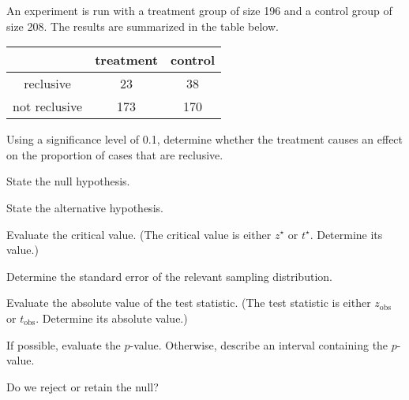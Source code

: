 
\begin{question}
An experiment is run with a treatment group of size 196 and a control
group of size 208. The results are summarized in the table below.

\begin{longtable}[]{@{}ccc@{}}
\toprule
& treatment & control\tabularnewline
\midrule
\endhead
reclusive & 23 & 38\tabularnewline
not reclusive & 173 & 170\tabularnewline
\bottomrule
\end{longtable}

Using a significance level of 0.1, determine whether the treatment
causes an effect on the proportion of cases that are reclusive.
\begin{answerlist}
  \item State the null hypothesis.
  \item State the alternative hypothesis.
  \item Evaluate the critical value. (The critical value is either \(z^\star\)
or \(t^\star\). Determine its value.)
  \item Determine the standard error of the relevant sampling distribution.
  \item Evaluate the absolute value of the test statistic. (The test statistic
is either \(z_\text{obs}\) or \(t_\text{obs}\). Determine its absolute
value.)
  \item If possible, evaluate the \(p\)-value. Otherwise, describe an interval
containing the \(p\)-value.
  \item Do we reject or retain the null?
\end{answerlist}
\end{question}

